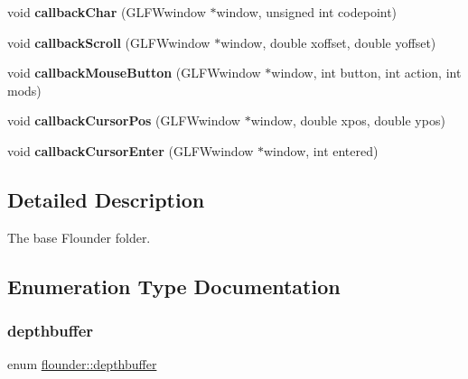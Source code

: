 \begin{DoxyCompactItemize}
\item 
\mbox{\label{namespaceflounder_a9fc9a8711933a0dc2ab6a8dd2145a9ff}} 
void {\bfseries callback\+Char} (G\+L\+F\+Wwindow $\ast$window, unsigned int codepoint)
\item 
\mbox{\label{namespaceflounder_a6817b4cc37291e7367063bd99f36cfaf}} 
void {\bfseries callback\+Scroll} (G\+L\+F\+Wwindow $\ast$window, double xoffset, double yoffset)
\item 
\mbox{\label{namespaceflounder_a3914861bc871e4d237b5878fde9bcbbd}} 
void {\bfseries callback\+Mouse\+Button} (G\+L\+F\+Wwindow $\ast$window, int button, int action, int mods)
\item 
\mbox{\label{namespaceflounder_a84f436b17b1e87b7e8ff691b9ab0bb09}} 
void {\bfseries callback\+Cursor\+Pos} (G\+L\+F\+Wwindow $\ast$window, double xpos, double ypos)
\item 
\mbox{\label{namespaceflounder_ab637dcebaebff142804649b9136870d8}} 
void {\bfseries callback\+Cursor\+Enter} (G\+L\+F\+Wwindow $\ast$window, int entered)
\end{DoxyCompactItemize}


\subsection{Detailed Description}
The base Flounder folder. 



\subsection{Enumeration Type Documentation}
\mbox{\label{namespaceflounder_aed09c736167e783c910ec9e58479b57c}} 
\subsubsection{\texorpdfstring{depthbuffer}{depthbuffer}}
{\footnotesize\ttfamily enum \hyperlink{namespaceflounder_aed09c736167e783c910ec9e58479b57c}{flounder\+::depthbuffer}}



